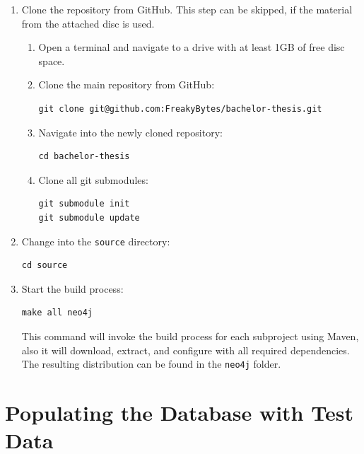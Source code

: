 \begin{enumerate}
	\item Clone the repository from GitHub. This step can be skipped, if the material from the attached disc is used.
	\begin{enumerate}
		\item Open a terminal and navigate to a drive with at least 1GB of free disc space.
		\item Clone the main repository from GitHub:
\begin{lstlisting}
git clone git@github.com:FreakyBytes/bachelor-thesis.git
\end{lstlisting}
		\pagebreak
		\item Navigate into the newly cloned repository:
\begin{lstlisting}
cd bachelor-thesis
\end{lstlisting}
		\item Clone all git submodules:
\begin{lstlisting}
git submodule init
git submodule update
\end{lstlisting}
	\end{enumerate}

	\item Change into the \texttt{source} directory:
\begin{lstlisting}
cd source
\end{lstlisting}

	\item Start the build process:
\begin{lstlisting}
make all neo4j
\end{lstlisting}
		This command will invoke the build process for each subproject using Maven, also it will download, extract, and configure \neoj with all required dependencies. The resulting distribution can be found in the \texttt{neo4j} folder.
\end{enumerate}

\section{Populating the Database with Test Data}

